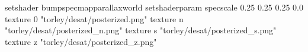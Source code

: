 setshader bumpspecmapparallaxworld
setshaderparam specscale 0.25 0.25 0.25 0.0
texture 0 "torley/desat/posterized.png"
texture n "torley/desat/posterized_n.png"
texture s "torley/desat/posterized_s.png"
texture z "torley/desat/posterized_z.png"

